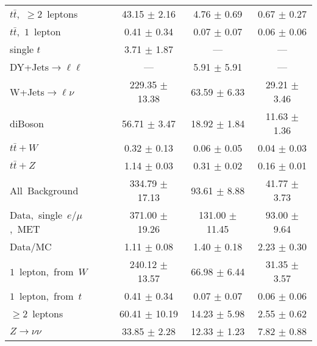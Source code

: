 \documentclass{article}
\begin{document}
\begin{longtable}{|l|c|c|c|}
$t\bar{t}$,~$\ge2$~leptons & 43.15 $\pm$ 2.16  & 4.76 $\pm$ 0.69  & 0.67 $\pm$ 0.27 \\* 
$t\bar{t}$,~$1$~lepton & 0.41 $\pm$ 0.34  & 0.07 $\pm$ 0.07  & 0.06 $\pm$ 0.06 \\* 
single $t$  & 3.71 $\pm$ 1.87  & ---  & --- \\* 
DY+Jets$\rightarrow\ell\ell$  & ---  & 5.91 $\pm$ 5.91  & --- \\* 
W+Jets$\rightarrow\ell\nu$  & 229.35 $\pm$ 13.38  & 63.59 $\pm$ 6.33  & 29.21 $\pm$ 3.46 \\* 
diBoson  & 56.71 $\pm$ 3.47  & 18.92 $\pm$ 1.84  & 11.63 $\pm$ 1.36 \\* 
$t\bar{t}+W$  & 0.32 $\pm$ 0.13  & 0.06 $\pm$ 0.05  & 0.04 $\pm$ 0.03 \\* 
$t\bar{t}+Z$  & 1.14 $\pm$ 0.03  & 0.31 $\pm$ 0.02  & 0.16 $\pm$ 0.01 \\* 
\hline \hline 
All~Background  & 334.79 $\pm$ 17.13  & 93.61 $\pm$ 8.88  & 41.77 $\pm$ 3.73 \\* 
Data,~single~$e/\mu$,~MET  & 371.00 $\pm$ 19.26  & 131.00 $\pm$ 11.45  & 93.00 $\pm$ 9.64 \\* 
Data/MC  & 1.11 $\pm$ 0.08  & 1.40 $\pm$ 0.18  & 2.23 $\pm$ 0.30 \\* 
\hline \hline 
$1$~lepton,~from~$W$  & 240.12 $\pm$ 13.57  & 66.98 $\pm$ 6.44  & 31.35 $\pm$ 3.57 \\* 
$1$~lepton,~from~$t$  & 0.41 $\pm$ 0.34  & 0.07 $\pm$ 0.07  & 0.06 $\pm$ 0.06 \\* 
$\ge2$~leptons  & 60.41 $\pm$ 10.19  & 14.23 $\pm$ 5.98  & 2.55 $\pm$ 0.62 \\* 
$Z\rightarrow\nu\nu$  & 33.85 $\pm$ 2.28  & 12.33 $\pm$ 1.23  & 7.82 $\pm$ 0.88 \\* 
\hline 
\end{longtable} 

 
 
 
 
\pagebreak 

 
 
 
 
\end{document}
